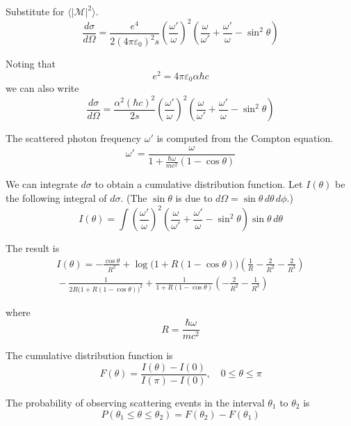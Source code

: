 \documentclass[12pt]{article}
\begin{document}
Substitute for $\langle|\mathcal{M}|^2\rangle$.
\begin{equation*}
\frac{d\sigma}{d\Omega}
=\frac{e^4}{2(4\pi\varepsilon_0)^2s}
\left(\frac{\omega'}{\omega}\right)^2
\left(
\frac{\omega}{\omega'}+\frac{\omega'}{\omega}-\sin^2\theta
\right)
\end{equation*}

Noting that
\begin{equation*}
e^2=4\pi\varepsilon_0\alpha\hbar c
\end{equation*}
we can also write
\begin{equation*}
\frac{d\sigma}{d\Omega}
=\frac{\alpha^2(\hbar c)^2}{2s}
\left(\frac{\omega'}{\omega}\right)^2
\left(
\frac{\omega}{\omega'}+\frac{\omega'}{\omega}-\sin^2\theta
\right)
\end{equation*}

The scattered photon frequency $\omega'$ is computed from the Compton equation.
\begin{equation*}
\omega'=\frac{\omega}{1+\frac{\hbar\omega}{mc^2}(1-\cos\theta)}
\end{equation*}

We can integrate $d\sigma$ to obtain a cumulative distribution function.
Let $I(\theta)$ be the following integral of $d\sigma$.
(The $\sin\theta$ is due to $d\Omega=\sin\theta\,d\theta\,d\phi$.)
\begin{equation*}
I(\theta)=
\int
\left(\frac{\omega'}{\omega}\right)^2
\left(\frac{\omega}{\omega'}+\frac{\omega'}{\omega}-\sin^2\theta\right)
\sin\theta\,d\theta
\end{equation*}

The result is
\begin{multline*}
I(\theta)=-\frac{\cos\theta}{R^2}
+\log\bigl(1+R(1-\cos\theta)\bigr)\left(\frac{1}{R}-\frac{2}{R^2}-\frac{2}{R^3}\right)
\\
{}-\frac{1}{2R\bigl(1+R(1-\cos\theta)\bigr)^2}
+\frac{1}{1+R(1-\cos\theta)}\left(-\frac{2}{R^2}-\frac{1}{R^3}\right)
\end{multline*}

where
\begin{equation*}
R=\frac{\hbar\omega}{mc^2}
\end{equation*}

The cumulative distribution function is
\begin{equation*}
F(\theta)=\frac{I(\theta)-I(0)}{I(\pi)-I(0)},
\quad
0\le\theta\le\pi
\end{equation*}

The probability of observing scattering events in the interval $\theta_1$ to $\theta_2$ is
\begin{equation*}
P(\theta_1\le\theta\le\theta_2)=F(\theta_2)-F(\theta_1)
\end{equation*}
\end{document}
